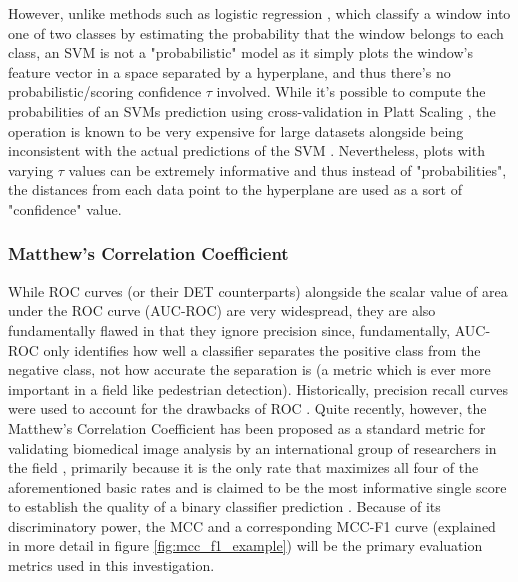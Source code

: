     However, unlike methods such as logistic regression \cite{cornell_log_regression_notes}, which classify a window into one of two classes by estimating the probability that the window belongs to each class, an SVM is not a "probabilistic" model as it simply plots the window's feature vector in a space separated by a hyperplane, and thus there's no probabilistic/scoring confidence $\tau$ involved. While it's possible to compute the probabilities of an SVMs prediction using cross-validation in Platt Scaling \cite{platt1999probabilistic}, the operation is known to be very expensive for large datasets \cite{scikit-learn_svm} alongside being inconsistent with the actual predictions of the SVM \cite{scikit-learn_svm}. Nevertheless, plots with varying $\tau$ values can be extremely informative \cite{martin1997det} \cite{scikit-learn_svm} and thus instead of "probabilities", the distances from each data point to the hyperplane are used as a sort of "confidence" value.

    \subsubsection{Matthew's Correlation Coefficient}

    While ROC curves (or their DET counterparts) alongside the scalar value of area under the ROC curve (AUC-ROC) are very widespread, they are also fundamentally flawed in that they ignore precision since, fundamentally, AUC-ROC only identifies how well a classifier separates the positive class from the negative class, not how accurate the separation is (a metric which is ever more important in a field like pedestrian detection). Historically, precision recall curves were used to account for the drawbacks of ROC \cite{chicco_jurman_2020_mcc_f1}. Quite recently, however, the Matthew's Correlation Coefficient has been proposed as a standard metric for validating biomedical image analysis by an international group of researchers in the field \cite{Maier_Hein_2024_mcc_proposal}, primarily because it is the only rate that maximizes all four of the aforementioned basic rates \cite{Maier_Hein_2024_mcc_proposal} \cite{chicco_eval_2023} \cite{chicco_jurman_2020_mcc_f1} and is claimed to be the most informative single score to establish the quality of a binary classifier prediction \cite{chicco_eval_2023}. Because of its discriminatory power, the MCC and a corresponding MCC-F1 curve (explained in more detail in figure \ref{fig:mcc_f1_example}) will be the primary evaluation metrics used in this investigation. 

